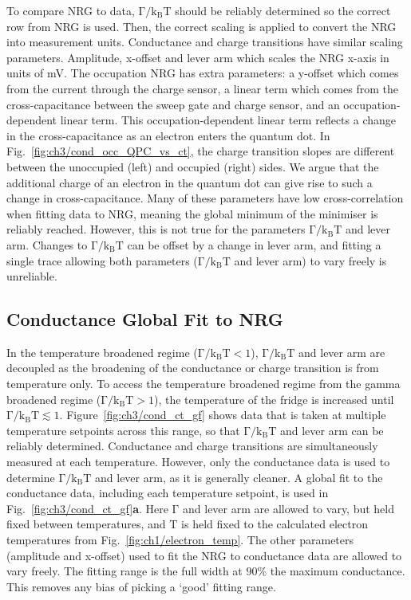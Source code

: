 To compare NRG to data, $\mathrm{\Gamma/k_BT}$ should be reliably determined so the correct row from NRG is used. Then, the correct scaling is applied to convert the NRG into measurement units. Conductance and charge transitions have similar scaling parameters. Amplitude, x-offset and lever arm which scales the NRG x-axis in units of mV. The occupation NRG has extra parameters: a y-offset which comes from the current through the charge sensor, a linear term which comes from the cross-capacitance between the sweep gate and charge sensor, and an occupation-dependent linear term. 
This occupation-dependent linear term reflects a change in the cross-capacitance as an electron enters the quantum dot. In Fig.~\ref{fig:ch3/cond_occ_QPC_vs_ct}, the charge transition slopes are different between the unoccupied (left) and occupied (right) sides. We argue that the additional charge of an electron in the quantum dot can give rise to such a change in cross-capacitance. Many of these parameters have low cross-correlation when fitting data to NRG, meaning the global minimum of the minimiser is reliably reached. However, this is not true for the parameters $\mathrm{\Gamma/k_BT}$ and lever arm. Changes to $\mathrm{\Gamma/k_BT}$ can be offset by a change in lever arm, and fitting a single trace allowing both parameters ($\mathrm{\Gamma/k_BT}$ and lever arm) to vary freely is unreliable. 


\subsection{Conductance Global Fit to NRG}
In the temperature broadened regime ($\mathrm{\Gamma/k_BT} < 1$), $\mathrm{\Gamma/k_BT}$ and lever arm are decoupled as the broadening of the conductance or charge transition is from temperature only. To access the temperature broadened regime from the gamma broadened regime ($\mathrm{\Gamma/k_BT} > 1$), the temperature of the fridge is increased until $\mathrm{\Gamma/k_BT} \lesssim 1$. Figure~\ref{fig:ch3/cond_ct_gf} shows data that is taken at multiple temperature setpoints across this range, so that $\mathrm{\Gamma/k_BT}$ and lever arm can be reliably determined. Conductance and charge transitions are simultaneously measured at each temperature. However, only the conductance data is used to determine $\mathrm{\Gamma/k_BT}$ and lever arm, as it is generally cleaner. A global fit to the conductance data, including each temperature setpoint, is used in Fig.~\ref{fig:ch3/cond_ct_gf}\textbf{a}. Here $\mathrm{\Gamma}$ and lever arm are allowed to vary, but held fixed between temperatures, and $\mathrm{T}$ is held fixed to the calculated electron temperatures from Fig.~\ref{fig:ch1/electron_temp}. The other parameters (amplitude and x-offset) used to fit the NRG to conductance data are allowed to vary freely.
The fitting range is the full width at $90\%$ the maximum conductance. This removes any bias of picking a `good' fitting range. 

